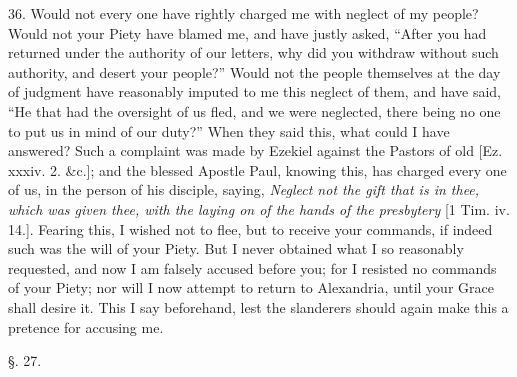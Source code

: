 36. Would not every one have rightly charged me with neglect of my
people? Would not your Piety have blamed me, and have justly asked, ``After
you had returned under the authority of our letters, why did you
withdraw without such authority, and desert your people?'' Would not
the people themselves at the day of judgment have reasonably imputed
to me this neglect of them, and have said, ``He that had the oversight
of us fled, and we were neglected, there being no one to put us in
mind of our duty?'' When they said this, what could I have answered?
Such a complaint was made by Ezekiel against the Pastors of old [Ez.
xxxiv. 2. \&c.]; and the blessed Apostle Paul, knowing this, has
charged every one of us, in the person of his disciple, saying, \emph{Neglect
not the gift that is in thee, which was given thee, with the laying on
of the hands of the presbytery} [1 Tim. iv. 14.]. Fearing this, I wished not to
flee, but to receive your commands, if indeed such was the will of
your Piety. But I never obtained what I so reasonably requested, and
now I am falsely accused before you; for I resisted no commands of
your Piety; nor will I now attempt to return to Alexandria, until your
Grace shall desire it. This I say beforehand, lest the slanderers
should again make this a pretence for accusing me.

§. 27.

